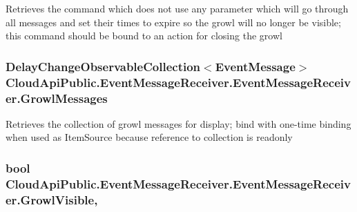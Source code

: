 Retrieves the command which does not use any parameter which will go through all messages and set their times to expire so the growl will no longer be visible; this command should be bound to an action for closing the growl 

\hypertarget{class_cloud_api_public_1_1_event_message_receiver_1_1_event_message_receiver_ab56088cad1ff2316973873b561ec1018}{
\subsubsection[{Growl\-Messages}]{\setlength{\rightskip}{0pt plus 5cm}Delay\-Change\-Observable\-Collection$<${\bf Event\-Message}$>$ Cloud\-Api\-Public.\-Event\-Message\-Receiver.\-Event\-Message\-Receiver.\-Growl\-Messages\hspace{0.3cm}{\ttfamily [get]}}}\label{class_cloud_api_public_1_1_event_message_receiver_1_1_event_message_receiver_ab56088cad1ff2316973873b561ec1018}


Retrieves the collection of growl messages for display; bind with one-\/time binding when used as Item\-Source because reference to collection is readonly 

\hypertarget{class_cloud_api_public_1_1_event_message_receiver_1_1_event_message_receiver_a082b999afb6c8b85f4d674a75bf341bb}{
\subsubsection[{Growl\-Visible}]{\setlength{\rightskip}{0pt plus 5cm}bool Cloud\-Api\-Public.\-Event\-Message\-Receiver.\-Event\-Message\-Receiver.\-Growl\-Visible\hspace{0.3cm}{\ttfamily [get]}, {\ttfamily [set]}}}\label{class_cloud_api_public_1_1_event_message_receiver_1_1_event_message_receiver_a082b999afb6c8b85f4d674a75bf341bb}


